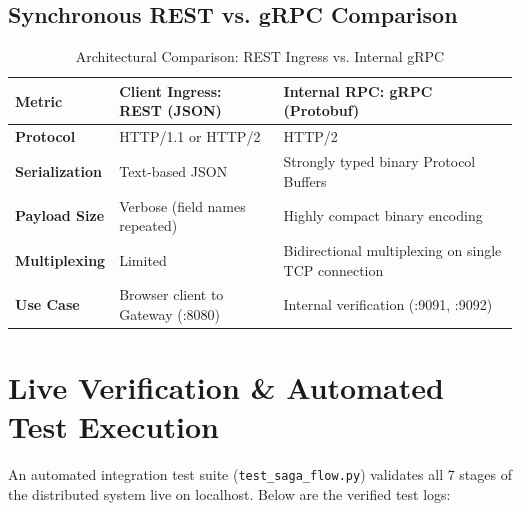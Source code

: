 \documentclass[11pt,a4paper]{article}
\begin{document}
\subsection{Synchronous REST vs. gRPC Comparison}
\begin{table}[H]
\centering
\small
\begin{tabular}{p{3.5cm} p{5cm} p{5.5cm}}
\toprule
\textbf{Metric} & \textbf{Client Ingress: REST (JSON)} & \textbf{Internal RPC: gRPC (Protobuf)} \\
\midrule
\textbf{Protocol} & HTTP/1.1 or HTTP/2 & HTTP/2 \\
\textbf{Serialization} & Text-based JSON & Strongly typed binary Protocol Buffers \\
\textbf{Payload Size} & Verbose (field names repeated) & Highly compact binary encoding \\
\textbf{Multiplexing} & Limited & Bidirectional multiplexing on single TCP connection \\
\textbf{Use Case} & Browser client to Gateway (:8080) & Internal verification (:9091, :9092) \\
\bottomrule
\end{tabular}
\caption{Architectural Comparison: REST Ingress vs. Internal gRPC}
\end{table}

\newpage
\section{Live Verification \& Automated Test Execution}

An automated integration test suite (\texttt{test\_saga\_flow.py}) validates all 7 stages of the distributed system live on localhost. Below are the verified test logs:
\end{document}
